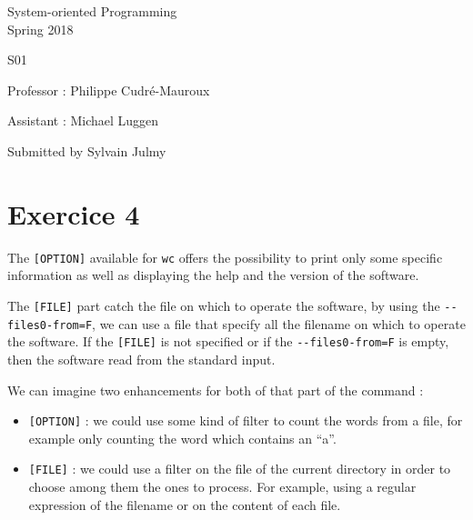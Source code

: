 \documentclass[a4paper,11pt]{report}
\author{Sylvain Julmy}
\date{\today}
\begin{document}
\begin{center}
  \Large{
    System-oriented Programming\\
    Spring 2018
  }
  
  \noindent\makebox[\linewidth]{\rule{\linewidth}{0.4pt}}
  S01
  \noindent\makebox[\linewidth]{\rule{\linewidth}{0.4pt}}

  \begin{flushleft}
    Professor : Philippe Cudré-Mauroux

    Assistant : Michael Luggen
  \end{flushleft}
  
  \noindent\makebox[\linewidth]{\rule{\linewidth}{0.4pt}}

  Submitted by Sylvain Julmy
  
  \noindent\makebox[\linewidth]{\rule{\textwidth}{1pt}}
\end{center}

\section*{Exercice 4}

The \verb|[OPTION]| available for \verb|wc| offers the possibility to print only
some specific information as well as displaying the help and the version of the
software.

The \verb|[FILE]| part catch the file on which to operate the software, by using
the \verb|--files0-from=F|, we can use a file that specify all the filename on
which to operate the software. If the \verb|[FILE]| is not specified or if the
\verb|--files0-from=F| is empty, then the software read from the standard input.

We can imagine two enhancements for both of that part of the command :

\begin{itemize}
\item \verb|[OPTION]| : we could use some kind of filter to count the words from
  a file, for example only counting the word which contains an ``a''.
\item \verb|[FILE]| : we could use a filter on the file of the current directory
  in order to choose among them the ones to process. For example, using a
  regular expression of the filename or on the content of each file.
\end{itemize}
\end{document}
